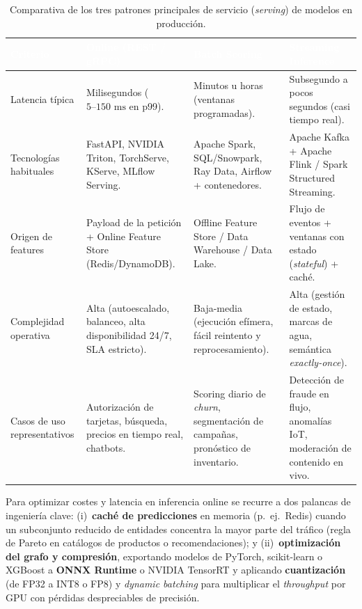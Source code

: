 \begin{table}[htbp]
\centering
\caption{Comparativa de los tres patrones principales de servicio (\textit{serving}) de modelos en producción.}
\label{tab:patrones-serving}
\small
\begin{tabularx}{\textwidth}{@{}L{2.8cm} Y Y Y@{}}
\toprule
{}
\textcolor{white}{\sffamily\bfseries Criterio} &
\textcolor{white}{\sffamily\bfseries Online (REST / gRPC)} &
\textcolor{white}{\sffamily\bfseries Batch Scoring} &
\textcolor{white}{\sffamily\bfseries Streaming Inference} \\
\midrule
Latencia típica &
Milisegundos ($5\text{--}150\text{ ms}$ en p99). &
Minutos u horas (ventanas programadas). &
Subsegundo a pocos segundos (casi tiempo real). \\
Tecnologías habituales &
FastAPI, NVIDIA Triton, TorchServe, KServe, MLflow Serving. &
Apache Spark, SQL/Snowpark, Ray Data, Airflow + contenedores. &
Apache Kafka + Apache Flink / Spark Structured Streaming. \\
Origen de features &
Payload de la petición + Online Feature Store (Redis/DynamoDB). &
Offline Feature Store / Data Warehouse / Data Lake. &
Flujo de eventos + ventanas con estado (\textit{stateful}) + caché. \\
Complejidad operativa &
Alta (autoescalado, balanceo, alta disponibilidad 24/7, SLA estricto). &
Baja-media (ejecución efímera, fácil reintento y reprocesamiento). &
Alta (gestión de estado, marcas de agua, semántica \textit{exactly-once}). \\
Casos de uso representativos &
Autorización de tarjetas, búsqueda, precios en tiempo real, chatbots. &
Scoring diario de \textit{churn}, segmentación de campañas, pronóstico de inventario. &
Detección de fraude en flujo, anomalías IoT, moderación de contenido en vivo. \\
\bottomrule
\end{tabularx}
\end{table}

Para optimizar costes y latencia en inferencia online se recurre a dos palancas de ingeniería clave: (i)~\textbf{caché de predicciones} en memoria (p.~ej.\ Redis) cuando un subconjunto reducido de entidades concentra la mayor parte del tráfico (regla de Pareto en catálogos de productos o recomendaciones); y (ii)~\textbf{optimización del grafo y compresión}, exportando modelos de PyTorch, scikit-learn o XGBoost a \textbf{ONNX Runtime} o NVIDIA TensorRT y aplicando \textbf{cuantización} (de FP32 a INT8 o FP8) y \textit{dynamic batching} para multiplicar el \textit{throughput} por GPU con pérdidas despreciables de precisión.

